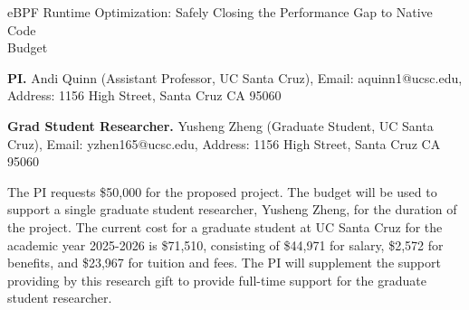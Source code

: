 \documentclass[12pt]{article}
\begin{document}
\setcounter{page}{1}

\begin{center}
{\large eBPF Runtime Optimization: Safely Closing the Performance Gap to Native Code 
\\
Budget
}
\end{center}


\noindent \textbf{PI.} Andi Quinn (Assistant Professor, UC Santa Cruz), Email: aquinn1@ucsc.edu, Address: 1156 High Street, Santa Cruz CA 95060

\noindent \textbf{Grad Student Researcher.} Yusheng Zheng (Graduate Student, UC Santa Cruz), Email: yzhen165@ucsc.edu, Address: 1156 High Street, Santa Cruz CA 95060

\vspace{2em}
The PI requests \$50,000 for the proposed project.  The budget will be used to support a single graduate student researcher, Yusheng Zheng, for the duration of the project.  The current cost for a graduate student at UC Santa Cruz for the academic year 2025-2026 is \$71,510, consisting of \$44,971 for salary, \$2,572 for benefits, and \$23,967 for tuition and fees.  The PI will supplement the support providing by this research gift to provide full-time support for the graduate student researcher.


% 
% 
% 
% 
% 

%
\end{document}
